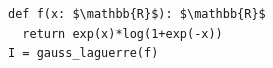 \documentclass[border=10pt]{standalone}
\begin{document}
\begin{lstlisting}
def f(x: $\mathbb{R}$): $\mathbb{R}$  
  return exp(x)*log(1+exp(-x))
I = gauss_laguerre(f)
\end{lstlisting}
\end{document}

